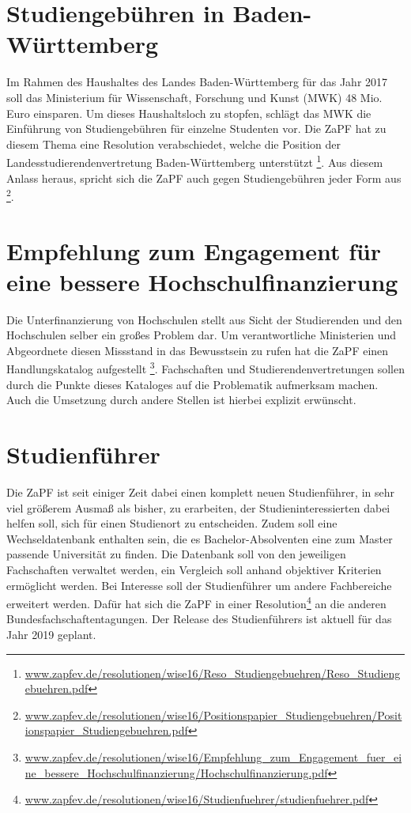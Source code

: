 \section*{Studiengebühren in Baden-Württemberg}
Im Rahmen des Haushaltes des Landes Baden-Württemberg für das Jahr 2017 soll das Ministerium für Wissenschaft, Forschung und Kunst (MWK) 48 Mio. Euro einsparen. 
Um dieses Haushaltsloch zu stopfen, schlägt das MWK die Einführung von Studiengebühren für einzelne Studenten vor. Die ZaPF hat zu diesem Thema eine Resolution verabschiedet, 
welche die Position der Landesstudierendenvertretung Baden-Württemberg unterstützt 
\footnote{\href{https://zapfev.de/resolutionen/wise16/Reso_Studiengebuehren/Reso_Studiengebuehren.pdf}{\url{www.zapfev.de/resolutionen/wise16/Reso_Studiengebuehren/Reso_Studiengebuehren.pdf}}}. 
Aus diesem Anlass heraus, spricht sich die ZaPF auch gegen Studiengebühren jeder Form aus
\footnote{\href{https://zapfev.de/resolutionen/wise16/Positionspapier_Studiengebuehren/Positionspapier_Studiengebuehren.pdf}{\url{www.zapfev.de/resolutionen/wise16/Positionspapier_Studiengebuehren/Positionspapier_Studiengebuehren.pdf}}}.

\section*{Empfehlung zum Engagement für eine bessere Hochschulfinanzierung}
Die Unterfinanzierung von Hochschulen stellt aus Sicht der Studierenden und den Hochschulen selber ein großes Problem dar. Um verantwortliche Ministerien und Abgeordnete 
diesen Missstand in das Bewusstsein zu rufen hat die ZaPF einen Handlungskatalog aufgestellt
\footnote{\href{https://zapfev.de/resolutionen/wise16/Empfehlung_zum_Engagement_fuer_eine_bessere_Hochschulfinanzierung/Hochschulfinanzierung.pdf}{\url{www.zapfev.de/resolutionen/wise16/Empfehlung_zum_Engagement_fuer_eine_bessere_Hochschulfinanzierung/Hochschulfinanzierung.pdf}}}. 
Fachschaften und Studierendenvertretungen sollen durch die Punkte dieses Kataloges auf die Problematik aufmerksam machen. Auch die Umsetzung durch andere Stellen ist 
hierbei explizit erwünscht.

\section*{Studienführer}
Die ZaPF ist seit einiger Zeit dabei einen komplett neuen Studienführer, in sehr viel größerem Ausmaß als bisher, zu erarbeiten, der Studieninteressierten 
dabei helfen soll, sich für einen Studienort zu entscheiden. Zudem soll eine Wechseldatenbank enthalten sein, die es Bachelor-Absolventen eine zum Master 
passende Universität zu finden. Die Datenbank soll von den jeweiligen Fachschaften verwaltet werden, ein Vergleich soll anhand objektiver Kriterien ermöglicht werden. 
Bei Interesse soll der Studienführer um andere Fachbereiche erweitert werden. Dafür hat sich die ZaPF in einer 
Resolution\footnote{\href{https://zapfev.de/resolutionen/wise16/Studienfuehrer/studienfuehrer.pdf}{\url{www.zapfev.de/resolutionen/wise16/Studienfuehrer/studienfuehrer.pdf}}} 
an die anderen Bundesfachschaftentagungen. Der Release des Studienführers ist aktuell für das Jahr 2019 geplant.

